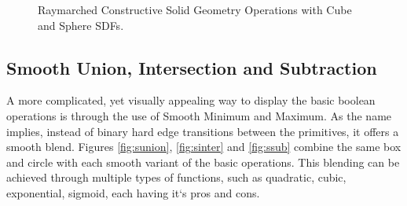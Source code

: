 \begin{figure}[h!]
    \caption{Raymarched Constructive Solid Geometry Operations with Cube and Sphere SDFs.}
    \label{fig:sdf_operations}
\end{figure}

\subsection{Smooth Union, Intersection and Subtraction}

A more complicated, yet visually appealing way to display the basic boolean operations is through the use of Smooth Minimum and Maximum. As the name implies, instead of binary hard edge transitions between the primitives, it offers a smooth blend. Figures \ref{fig:sunion}, \ref{fig:sinter} and \ref{fig:ssub} combine the same box and circle with each smooth variant of the basic operations.
This blending can be achieved through multiple types of functions, such as quadratic, cubic, exponential, sigmoid, each having it`s pros and cons.


